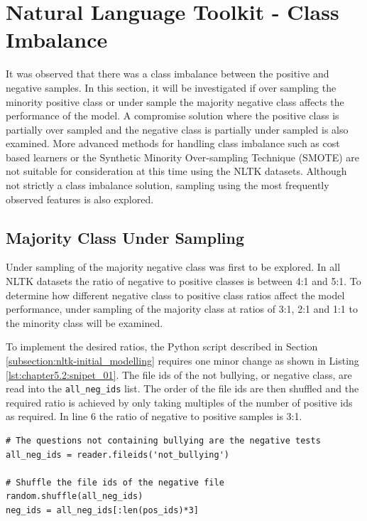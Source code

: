 \section{Natural Language Toolkit - Class Imbalance}
\label{subsection:nltk-class_imbalance}

It was observed that there was a class imbalance between the positive and negative samples. In this section, it will be investigated if over sampling the minority positive class or under sample the majority negative class affects the performance of the model. A compromise solution where the positive class is partially over sampled and the negative class is partially under sampled is also examined. More advanced methods for handling class imbalance such as cost based learners or the Synthetic Minority Over-sampling Technique (SMOTE) are not suitable for consideration at this time using the NLTK datasets. Although not strictly a class imbalance solution, sampling using the most frequently observed features is also explored.

\subsection{Majority Class Under Sampling}
Under sampling of the majority negative class was first to be explored. In all NLTK datasets the ratio of negative to positive classes is between 4:1 and 5:1. To determine how different negative class to positive class ratios affect the model performance, under sampling of the majority class at ratios of 3:1, 2:1 and 1:1 to the minority class will be examined.

To implement the desired ratios, the Python script described in Section \ref{subsection:nltk-initial_modelling} requires one minor change as shown in Listing \ref{lst:chapter5.2:snipet_01}. The file ids of the not bullying, or negative class, are read into the \verb|all_neg_ids| list. The order of the file ids are then shuffled and the required ratio is achieved by only taking multiples of the number of positive ids as required. In line 6 the ratio of negative to positive samples is 3:1. 

\begin{lstlisting}[caption={Adjust the postive to negative class ratio}, label=lst:chapter5.2:snipet_01]
# The questions not containing bullying are the negative tests
all_neg_ids = reader.fileids('not_bullying')

# Shuffle the file ids of the negative file
random.shuffle(all_neg_ids)
neg_ids = all_neg_ids[:len(pos_ids)*3]
\end{lstlisting}

